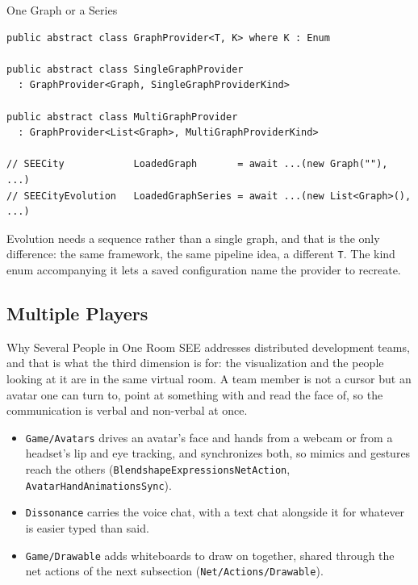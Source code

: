 \begin{frame}[fragile]{One Graph or a Series}
  \begin{lstlisting}[basicstyle=\scriptsize\ttfamily]
public abstract class GraphProvider<T, K> where K : Enum

public abstract class SingleGraphProvider
  : GraphProvider<Graph, SingleGraphProviderKind>

public abstract class MultiGraphProvider
  : GraphProvider<List<Graph>, MultiGraphProviderKind>

// SEECity            LoadedGraph       = await ...(new Graph(""), ...)
// SEECityEvolution   LoadedGraphSeries = await ...(new List<Graph>(), ...)
  \end{lstlisting}
  \vspace{1ex}

  Evolution needs a sequence rather than a single graph, and that is the only
  difference: the same framework, the same pipeline idea, a different
  \texttt{T}. The kind enum accompanying it lets a saved configuration name
  the provider to recreate.
\end{frame}

\subsection{Multiple Players}

\begin{frame}{Why Several People in One Room}
  SEE addresses distributed development teams, and that is what the third
  dimension is for: the visualization and the people looking at it are in the
  same virtual room. A team member is not a cursor but an avatar one can turn
  to, point at something with and read the face of, so the communication is
  verbal and non-verbal at once.
  \vspace{1ex}

  \begin{itemize}
    \item \texttt{Game/Avatars} drives an avatar's face and hands from a webcam
      or from a headset's lip and eye tracking, and synchronizes both, so
      mimics and gestures reach the others
      (\texttt{BlendshapeExpressionsNetAction},
      \texttt{AvatarHandAnimationsSync}).
    \item \texttt{Dissonance} carries the voice chat, with a text chat
      alongside it for whatever is easier typed than said.
    \item \texttt{Game/Drawable} adds whiteboards to draw on together, shared
      through the net actions of the next subsection
      (\texttt{Net/Actions/Drawable}).
  \end{itemize}
\end{frame}

